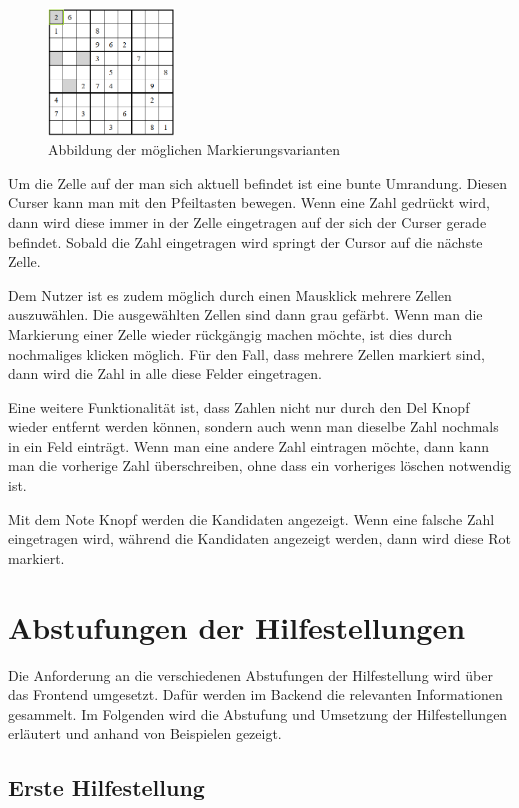 \begin{figure}[htbp]
	\centering
	\includegraphics[width=0.3\textwidth]{images/Markierungen.png}
	\caption{Abbildung der möglichen Markierungsvarianten}
	\label{fig:Markierungen}
\end{figure}

Um die Zelle auf der man sich aktuell befindet ist eine bunte Umrandung. Diesen Curser kann man mit den Pfeiltasten bewegen. Wenn eine Zahl gedrückt wird, dann wird diese immer in der Zelle eingetragen auf der sich der Curser gerade befindet. Sobald die Zahl eingetragen wird springt der Cursor auf die nächste Zelle. 

Dem Nutzer ist es zudem möglich durch einen Mausklick mehrere Zellen auszuwählen. Die ausgewählten Zellen sind dann grau gefärbt. Wenn man die Markierung einer Zelle wieder rückgängig machen möchte, ist dies durch nochmaliges klicken möglich. Für den Fall, dass mehrere Zellen markiert sind, dann wird die Zahl in alle diese Felder eingetragen.

Eine weitere Funktionalität ist, dass Zahlen nicht nur durch den Del Knopf wieder entfernt werden können, sondern auch wenn man dieselbe Zahl nochmals in ein Feld einträgt. Wenn man eine andere Zahl eintragen möchte, dann kann man die vorherige Zahl überschreiben, ohne dass ein vorheriges löschen notwendig ist. 

Mit dem Note Knopf werden die Kandidaten angezeigt. Wenn eine falsche Zahl eingetragen wird, während die Kandidaten angezeigt werden, dann wird diese Rot markiert. 


\section{Abstufungen der Hilfestellungen}\label{Abstufung}
Die Anforderung an die verschiedenen Abstufungen der Hilfestellung wird über das Frontend umgesetzt. Dafür werden im Backend die relevanten Informationen gesammelt. Im Folgenden wird die Abstufung und Umsetzung der Hilfestellungen erläutert und anhand von Beispielen gezeigt.

\subsection{Erste Hilfestellung}

